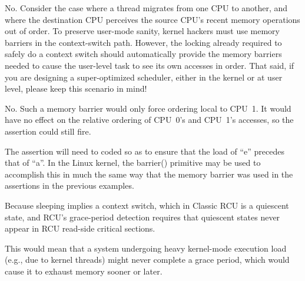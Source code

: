 	No.  Consider the case where a thread migrates from one CPU to
	another, and where the destination CPU perceives the source
	CPU's recent memory operations out of order.  To preserve
	user-mode sanity, kernel hackers must use memory barriers in
	the context-switch path.  However, the locking already required
	to safely do a context switch should automatically provide
	the memory barriers needed to cause the user-level task to see
	its own accesses in order.  That said, if you are designing a
	super-optimized scheduler, either in the kernel or at user level,
	please keep this scenario in mind!


No.  Such a memory barrier would only force ordering local to CPU~1.
It would have no effect on the relative ordering of CPU~0's and
CPU~1's accesses, so the assertion could still fire.


The assertion will need to coded so as to ensure that the load of
``e'' precedes that of ``a''.
In the Linux kernel, the barrier() primitive may be used to accomplish
this in much the same way that the memory barrier was used in the
assertions in the previous examples.


Because sleeping implies a context switch, which in Classic RCU is
a quiescent state, and RCU's grace-period detection requires that
quiescent states never appear in RCU read-side critical sections.


This would mean that a system undergoing heavy kernel-mode execution load
(e.g., due to kernel threads) might never complete a grace period, which
would cause it to exhaust memory sooner or later.


